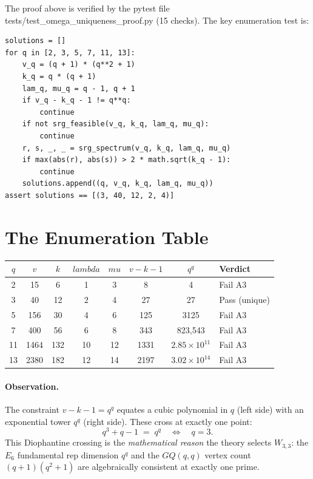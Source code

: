 \documentclass[12pt,a4paper]{article}
\def\mathrm#1{#1}%
\def\textbf#1{#1}%
\def\texttt#1{#1}%
\def\lambda{lambda}%
\def\mu{mu}%
\theoremstyle{definition}
\newcommand{\GQ}{\mathrm{GQ}}
\begin{document}
The proof above is verified by the pytest file
\texttt{tests/test\_omega\_uniqueness\_proof.py} (15 checks).
The key enumeration test is:

\begin{verbatim}
solutions = []
for q in [2, 3, 5, 7, 11, 13]:
    v_q = (q + 1) * (q**2 + 1)
    k_q = q * (q + 1)
    lam_q, mu_q = q - 1, q + 1
    if v_q - k_q - 1 != q**q:
        continue
    if not srg_feasible(v_q, k_q, lam_q, mu_q):
        continue
    r, s, _, _ = srg_spectrum(v_q, k_q, lam_q, mu_q)
    if max(abs(r), abs(s)) > 2 * math.sqrt(k_q - 1):
        continue
    solutions.append((q, v_q, k_q, lam_q, mu_q))
assert solutions == [(3, 40, 12, 2, 4)]
\end{verbatim}

\section*{The Enumeration Table}

\begin{longtable}{cccccccl}
\toprule
$q$ & $v$ & $k$ & $\lambda$ & $\mu$ & $v{-}k{-}1$ & $q^q$ & Verdict \\
\midrule\endhead
2  & 15   & 6   & 1  & 3  & 8    & 4       & Fail A3 \\
\textbf{3}  & \textbf{40}   & \textbf{12}  & \textbf{2}  & \textbf{4}  & \textbf{27}   & \textbf{27}      & \textbf{Pass (unique)} \\
5  & 156  & 30  & 4  & 6  & 125  & 3125    & Fail A3 \\
7  & 400  & 56  & 6  & 8  & 343  & 823{,}543 & Fail A3 \\
11 & 1464 & 132 & 10 & 12 & 1331 & $2.85{\times}10^{11}$ & Fail A3 \\
13 & 2380 & 182 & 12 & 14 & 2197 & $3.02{\times}10^{14}$ & Fail A3 \\
\bottomrule
\end{longtable}

\paragraph{Observation.}
The constraint $v-k-1 = q^q$ equates a cubic polynomial in $q$ (left
side) with an exponential tower $q^q$ (right side). These cross at
exactly one point:
\[
q^3 + q - 1 \;=\; q^q \quad\Longleftrightarrow\quad q = 3.
\]
This Diophantine crossing is the \emph{mathematical reason} the theory
selects $W_{3,3}$: the $E_6$ fundamental rep dimension $q^q$ and the
$\GQ(q,q)$ vertex count $(q+1)(q^2+1)$ are algebraically consistent at
exactly one prime.
\end{document}
